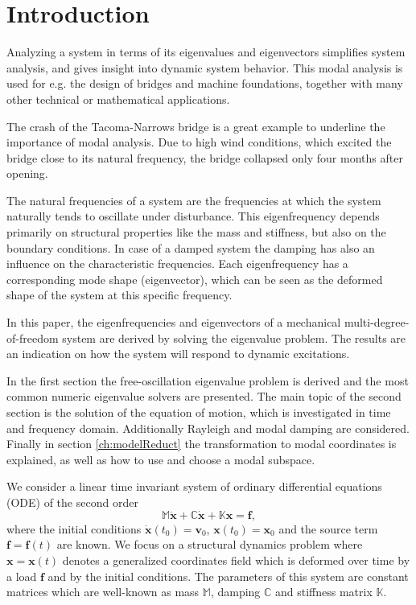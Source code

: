 \documentclass[conference]{journal}
\newcommand{\bb}[1]{\mathbb{#1}}
\newcommand{\B}[1]{\mathbf{#1}}
\newcommand{\Bx}{\B{x}}
\newcommand{\M}{\bb{M}}
\newcommand{\C}{\bb{C}}
\newcommand{\K}{\bb{K}}
\begin{document}
	\section{Introduction}
	Analyzing a system in terms of its eigenvalues and eigenvectors simplifies system analysis, and gives insight into dynamic system behavior.
	This modal analysis is used for e.g. the design of bridges and machine foundations, together with many other technical or mathematical applications. 
	
	The crash of the Tacoma-Narrows bridge is a great example to underline the importance of modal analysis. Due to high wind conditions, which excited the bridge close to its natural frequency, the bridge collapsed only four months after opening. 

	The natural frequencies of a system are the frequencies at which the system naturally tends to oscillate under disturbance. This  eigenfrequency depends primarily on structural properties like the mass and stiffness, but also on the boundary conditions. In case of a damped system the damping has also an influence on the characteristic frequencies. Each eigenfrequency has a corresponding mode shape (eigenvector), which can be seen as the deformed shape of the system at this specific frequency. 
	
	In this paper, the eigenfrequencies and eigenvectors of a mechanical multi-degree-of-freedom system are derived by solving the eigenvalue problem. The results are an indication on how the system will respond to dynamic excitations.
	
	In the first section the free-oscillation eigenvalue problem is derived and the most common numeric eigenvalue solvers are presented. The main topic of the second section is the solution of the equation of motion, which is investigated in time and frequency domain. Additionally Rayleigh and modal damping are considered. Finally in section \ref{ch:modelReduct} the transformation to modal coordinates is explained, as well as how to use and choose a modal subspace.

	We consider a linear time invariant system of ordinary differential equations (ODE) of the second order
	\begin{equation} \label{eq:2system}
	\M \ddot{\Bx} + \C \dot{\Bx} + \K \Bx = \B{f},
	\end{equation}
	where the initial conditions $\dot{\Bx}(t_0)=\B{v}_0$, $\Bx(t_0)=\Bx_0$ and the source term $\B{f}=\B{f}(t)$ are known. We focus on a structural dynamics problem where $\Bx=\Bx(t)$ denotes a generalized coordinates field which is deformed over time by a load $\B{f}$ and by the initial conditions. The parameters of this system are constant matrices which are well-known as mass $\M$, damping $\C$ and stiffness matrix $\K$.
\end{document}
